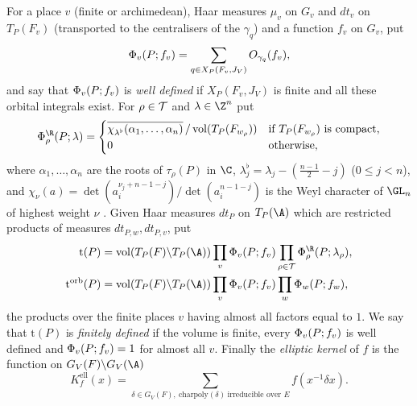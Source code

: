 \begin{definition}\label{pf:multnc:def-terms}
For a place $v$ (finite or archimedean), Haar measures $\mu_v$ on $G_v$ and $dt_v$ on $T_P(F_v)$ (transported to the
centralisers of the $\gamma_q$) and a function $f_v$ on $G_v$, put
\begin{equation}\label{pf:multnc:eq-Phi}
\Phi_v(P;f_v)=\sum_{q\in X_P(F_v,J_V)}O_{\gamma_q}(f_v),
\end{equation}
and say that $\Phi_v(P;f_v)$ is \emph{well defined} if $X_P(F_v,J_V)$ is finite and all these orbital integrals
exist. For $\rho\in\mathcal{T}$ and $\lambda\in\Z^n$ put
\begin{equation}\label{pf:multnc:eq-PhiReal}
\multncPhi^{\R}_\rho(P;\lambda)=\begin{cases}\overline{\chi_{\lambda^\flat}(\alpha_1,\dots,\alpha_n)}\,/\,
\mathrm{vol}(T_P(F_{w_\rho}))&\text{if $T_P(F_{w_\rho})$ is compact,}\\ 0&\text{otherwise,}\end{cases}
\end{equation}
where $\alpha_1,\dots,\alpha_n$ are the roots of $\tau_\rho(P)$ in $\C$, $\lambda^\flat_j=\lambda_j-(\frac{n-1}2-j)$
($0\le j<n$), and $\chi_\nu(a)=\det(a_i^{\nu_j+n-1-j})/\det(a_i^{n-1-j})$ is the Weyl character of $\GL_n$ of highest
weight $\nu$ \cite{Weyl1946}. Given Haar measures $dt_P$ on $T_P(\A)$ which are restricted products of measures
$dt_{P,w},dt_{P,v}$, put
\begin{align}
\mathrm{t}(P)&=\mathrm{vol}(T_P(F)\backslash T_P(\A))\prod_v\multncPhi_v(P;f_v)\prod_{\rho\in\multncT}
\multncPhi^{\R}_\rho(P;\lambda_\rho),\label{pf:multnc:eq-term}\\
\mathrm{t}^{\mathrm{orb}}(P)&=\mathrm{vol}(T_P(F)\backslash T_P(\A))\prod_v\multncPhi_v(P;f_v)
\prod_{w}\multncPhi_w(P;f_w),\label{pf:multnc:eq-termorb}
\end{align}
the products over the finite places $v$ having almost all factors equal to $1$. We say that $\mathrm{t}(P)$ is
\emph{finitely defined} if the volume is finite, every $\Phi_v(P;f_v)$ is well defined and $\Phi_v(P;f_v)=1$ for
almost all $v$. Finally the \emph{elliptic kernel} of $f$ is the function on $G_V(F)\backslash G_V(\A)$
\begin{equation}\label{pf:multnc:eq-ellkernel}
K^{\mathrm{ell}}_f(x)=\sum_{\delta\in G_V(F),\ \mathrm{charpoly}(\delta)\ \text{irreducible over }E}f(x^{-1}\delta x).
\end{equation}
\end{definition}


